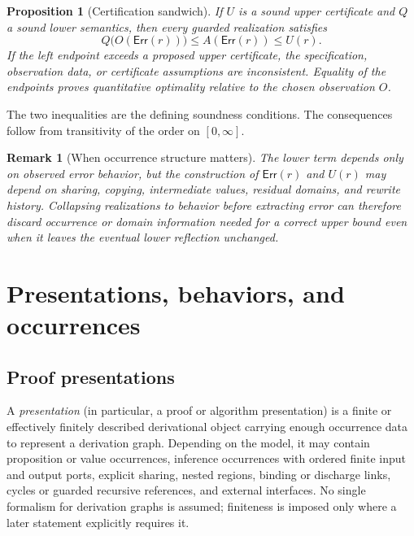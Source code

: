 \documentclass[12pt,a4paper,twoside]{extarticle}
\makeatletter
\theoremstyle{compactplain}
\newtheorem{proposition}[theorem]{Proposition}
\theoremstyle{compactdef}
\newtheorem{remark}[theorem]{Remark}
\renewenvironment{proof}[1][\proofname]{\par\pushQED{\qed}\normalfont
  \topsep2pt\trivlist\item[\hskip\labelsep\bfseries #1\@addpunct{.}]\ignorespaces}
 {\popQED\endtrivlist\@endpefalse}
\newcommand{\Err}{\mathsf{Err}}
\makeatother
\begin{document}
\begin{proposition}[Certification sandwich]\label{prop:basic-sandwich}
If $U$ is a sound upper certificate and $Q$ a sound lower semantics, then every guarded realization satisfies
\[
  Q\bigl(O(\Err(r))\bigr)\le A(\Err(r))\le U(r).
\]
If the left endpoint exceeds a proposed upper certificate, the specification, observation data, or certificate assumptions are inconsistent.  Equality of the endpoints proves quantitative optimality relative to the chosen observation $O$.
\end{proposition}
\begin{proof}
The two inequalities are the defining soundness conditions.  The consequences follow from transitivity of the order on $[0,\infty]$.
\end{proof}

\begin{remark}[When occurrence structure matters]
The lower term depends only on observed error behavior, but the construction of $\Err(r)$ and $U(r)$ may depend on sharing, copying, intermediate values, residual domains, and rewrite history.  Collapsing realizations to behavior before extracting error can therefore discard occurrence or domain information needed for a correct upper bound even when it leaves the eventual lower reflection unchanged.
\end{remark}
\section{Presentations, behaviors, and occurrences}\label{sec:five-roles}

\subsection{Proof presentations}
A \emph{presentation} (in particular, a proof or algorithm presentation) is a finite or effectively finitely described derivational object carrying enough occurrence data to represent a derivation graph. Depending on the model, it may contain proposition or value occurrences, inference occurrences with ordered finite input and output ports, explicit sharing, nested regions, binding or discharge links, cycles or guarded recursive references, and external interfaces.  No single formalism for derivation graphs is assumed; finiteness is imposed only where a later statement explicitly requires it.
\end{document}
